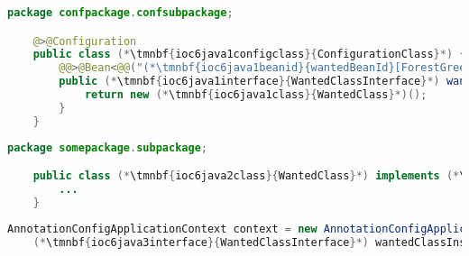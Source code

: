 \begin{lstlisting}[language=Java, title={Configuration class}]
    package confpackage.confsubpackage;

    @>@Configuration
    public class (*\tmnbf{ioc6java1configclass}{ConfigurationClass}*) {
        @@>@Bean<@@("(*\tmnbf{ioc6java1beanid}{wantedBeanId}[ForestGreen]*)")
        public (*\tmnbf{ioc6java1interface}{WantedClassInterface}*) wantedBeanMethod() {
            return new (*\tmnbf{ioc6java1class}{WantedClass}*)();
        }
    }
\end{lstlisting}
\begin{lstlisting}[language=Java, title={Wanted class}]
    package somepackage.subpackage;

    public class (*\tmnbf{ioc6java2class}{WantedClass}*) implements (*\tmnbf{ioc6java2interface}{WantedClassInterface}*) {
        ...
    }
\end{lstlisting}
\begin{lstlisting}[language=Java, title={Usage}]
    AnnotationConfigApplicationContext context = new AnnotationConfigApplicationContext((*\tmnbf{ioc6java3configclass}{ConfigurationClass}*).class);
    (*\tmnbf{ioc6java3interface}{WantedClassInterface}*) wantedClassInstance = context.getBean("(*\tmnbf{ioc6java3beanid}{wantedBeanId}[ForestGreen]*)", (*\tmnbf{ioc6java3interface2}{WantedClassInterface}*).class);
\end{lstlisting}
\newpage


